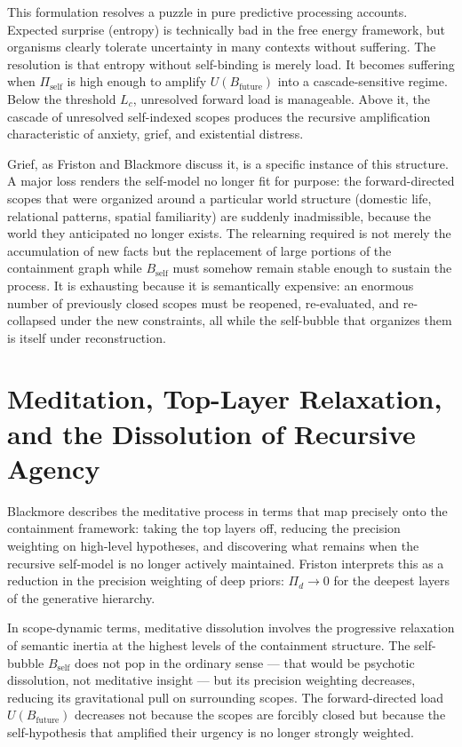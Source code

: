\documentclass[12pt, a4paper]{article}
\theoremstyle{plain}
\theoremstyle{definition}
\theoremstyle{remark}
\begin{document}
This formulation resolves a puzzle in pure predictive processing accounts.
Expected surprise (entropy) is technically bad in the free energy framework,
but organisms clearly tolerate uncertainty in many contexts without suffering.
The resolution is that entropy without self-binding is merely load. It becomes
suffering when $\Pi_{\text{self}}$ is high enough to amplify $U(B_{\text{future}})$
into a cascade-sensitive regime. Below the threshold $L_c$, unresolved
forward load is manageable. Above it, the cascade of unresolved
self-indexed scopes produces the recursive amplification characteristic of
anxiety, grief, and existential distress.

Grief, as Friston and Blackmore discuss it, is a specific instance of this
structure. A major loss renders the self-model no longer fit for purpose: the
forward-directed scopes that were organized around a particular world structure
(domestic life, relational patterns, spatial familiarity) are suddenly
inadmissible, because the world they anticipated no longer exists. The
relearning required is not merely the accumulation of new facts but the
replacement of large portions of the containment graph while $B_{\text{self}}$
must somehow remain stable enough to sustain the process. It is exhausting
because it is semantically expensive: an enormous number of previously closed
scopes must be reopened, re-evaluated, and re-collapsed under the new
constraints, all while the self-bubble that organizes them is itself under
reconstruction.

\section{Meditation, Top-Layer Relaxation, and the Dissolution of Recursive Agency}

Blackmore describes the meditative process in terms that map precisely onto
the containment framework: taking the top layers off, reducing the precision
weighting on high-level hypotheses, and discovering what remains when the
recursive self-model is no longer actively maintained. Friston interprets this
as a reduction in the precision weighting of deep priors:
$\Pi_d \to 0$ for the deepest layers of the generative hierarchy.

In scope-dynamic terms, meditative dissolution involves the progressive
relaxation of semantic inertia at the highest levels of the containment
structure. The self-bubble $B_{\text{self}}$ does not pop in the ordinary sense
— that would be psychotic dissolution, not meditative insight — but its
precision weighting decreases, reducing its gravitational pull on surrounding
scopes. The forward-directed load $U(B_{\text{future}})$ decreases not because
the scopes are forcibly closed but because the self-hypothesis that amplified
their urgency is no longer strongly weighted.
\end{document}
